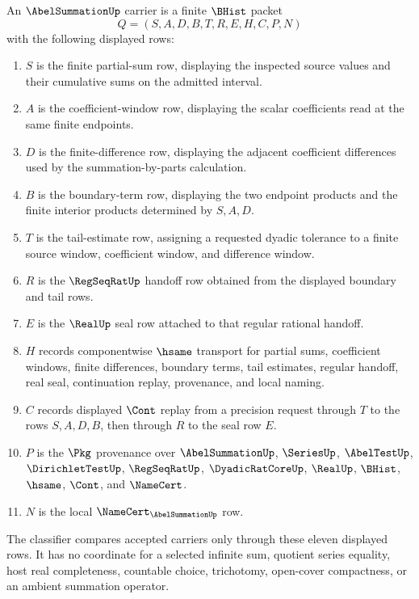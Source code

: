 \begin{definition}
\label{def:abel-summation-carrier}
An $\AbelSummationUp$ carrier is a finite $\BHist$ packet
$$
Q=(S,A,D,B,T,R,E,H,C,P,N)
$$
with the following displayed rows:
\begin{enumerate}
\item $S$ is the finite partial-sum row, displaying the inspected source values and their cumulative sums on the admitted interval.
\item $A$ is the coefficient-window row, displaying the scalar coefficients read at the same finite endpoints.
\item $D$ is the finite-difference row, displaying the adjacent coefficient differences used by the summation-by-parts calculation.
\item $B$ is the boundary-term row, displaying the two endpoint products and the finite interior products determined by $S,A,D$.
\item $T$ is the tail-estimate row, assigning a requested dyadic tolerance to a finite source window, coefficient window, and difference window.
\item $R$ is the $\RegSeqRatUp$ handoff row obtained from the displayed boundary and tail rows.
\item $E$ is the $\RealUp$ seal row attached to that regular rational handoff.
\item $H$ records componentwise $\hsame$ transport for partial sums, coefficient windows, finite differences, boundary terms, tail estimates, regular handoff, real seal, continuation replay, provenance, and local naming.
\item $C$ records displayed $\Cont$ replay from a precision request through $T$ to the rows $S,A,D,B$, then through $R$ to the seal row $E$.
\item $P$ is the $\Pkg$ provenance over $\AbelSummationUp$, $\SeriesUp$, $\AbelTestUp$, $\DirichletTestUp$, $\RegSeqRatUp$, $\DyadicRatCoreUp$, $\RealUp$, $\BHist$, $\hsame$, $\Cont$, and $\NameCert$.
\item $N$ is the local $\NameCert_{\AbelSummationUp}$ row.
\end{enumerate}
The classifier compares accepted carriers only through these eleven displayed rows. It has no coordinate for a selected infinite sum, quotient series equality, host real completeness, countable choice, trichotomy, open-cover compactness, or an ambient summation operator.
\end{definition}

